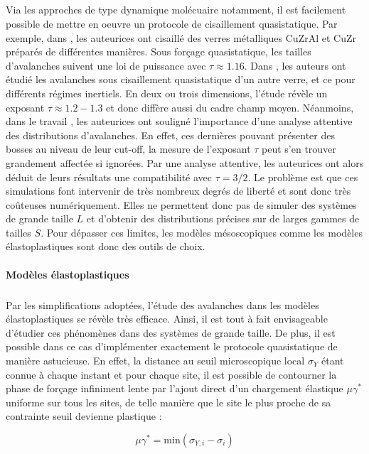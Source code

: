 \subparagraph{}Via les approches de type dynamique molécuaire notamment, il est facilement possible de mettre en oeuvre un protocole de cisaillement quasistatique. Par exemple, dans \cite{makinen_avalanches_2025}, les auteurices ont cisaillé des verres métalliques CuZrAl et CuZr préparés de différentes manières. Sous forçage quasistatique, les tailles d'avalanches suivent une loi de puissance avec $\tau \approx 1.16$. Dans \cite{salerno_effect_2013}, les auteurs ont étudié les avalanches sous cisaillement quasistatique d'un autre verre, et ce pour différents régimes inertiels. En deux ou trois dimensions, l'étude révèle un exposant $\tau \approx 1.2-1.3$ et donc diffère aussi du cadre champ moyen. Néanmoins, dans le travail \cite{oyama_unified_2021}, les auteurices ont souligné l'importance d'une analyse attentive des distributions d'avalanches. En effet, ces dernières pouvant présenter des bosses au niveau de leur cut-off, la mesure de l'exposant $\tau$ peut s'en trouver grandement affectée si ignorées. Par une analyse attentive, les auteurices ont alors déduit de leurs résultats une compatibilité avec $\tau=3/2$. Le problème est que ces simulations font intervenir de très nombreux degrés de liberté et sont donc très coûteuses numériquement. Elles ne permettent donc pas de simuler des systèmes de grande taille $L$ et d'obtenir des distributions précises sur de larges gammes de tailles $S$. Pour dépasser ces limites, les modèles mésoscopiques comme les modèles élastoplastiques sont donc des outils de choix.

\paragraph{Modèles élastoplastiques}

\subparagraph{}Par les simplifications adoptées, l'étude des avalanches dans les modèles élastoplastiques se révèle très efficace. Ainsi, il est tout à fait envisageable d'étudier ces phénomènes dans des systèmes de grande taille. De plus, il est possible dans ce cas d'implémenter exactement le protocole quasistatique de manière astucieuse. En effet, la distance au seuil microscopique local $\sigma_Y$ étant connue à chaque instant et pour chaque site, il est possible de contourner la phase de forçage infiniment lente par l'ajout direct d'un chargement élastique $\mu\gamma^*$ uniforme sur tous les sites, de telle manière que le site le plus proche de sa contrainte seuil devienne plastique :

\begin{equation}
	\mu\gamma^* = \mathrm{min}(\sigma_{Y,i}-\sigma_i)
\end{equation}

